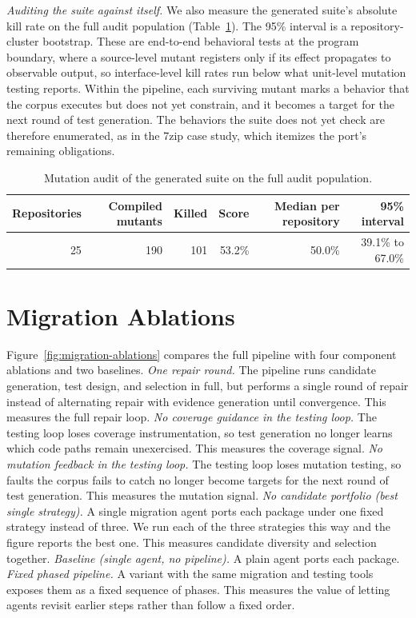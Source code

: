 \emph{Auditing the suite against itself.}
We also measure the generated suite's absolute kill rate on the full audit population (Table~\ref{tab:mutation-audit}).
The 95\% interval is a repository-cluster bootstrap.
These are end-to-end behavioral tests at the program boundary, where a source-level mutant registers only if its effect propagates to observable output, so interface-level kill rates run below what unit-level mutation testing reports.
Within the pipeline, each surviving mutant marks a behavior that the corpus executes but does not yet constrain, and it becomes a target for the next round of test generation.
The behaviors the suite does not yet check are therefore enumerated, as in the 7zip case study, which itemizes the port's remaining obligations.

\begin{table}[h]
\centering
\caption{Mutation audit of the generated suite on the full audit population.}
\label{tab:mutation-audit}
\small
\begin{tabular}{rrrrrr}
\toprule
Repositories & Compiled mutants & Killed & Score & Median per repository & 95\% interval \\
\midrule
25 & 190 & 101 & 53.2\% & 50.0\% & 39.1\% to 67.0\% \\
\bottomrule
\end{tabular}
\end{table}

\section{Migration Ablations}
\label{app:ablation}

Figure~\ref{fig:migration-ablations} compares the full pipeline with four component ablations and two baselines.
\emph{One repair round.} The pipeline runs candidate generation, test design, and selection in full, but performs a single round of repair instead of alternating repair with evidence generation until convergence. This measures the full repair loop.
\emph{No coverage guidance in the testing loop.} The testing loop loses coverage instrumentation, so test generation no longer learns which code paths remain unexercised. This measures the coverage signal.
\emph{No mutation feedback in the testing loop.} The testing loop loses mutation testing, so faults the corpus fails to catch no longer become targets for the next round of test generation. This measures the mutation signal.
\emph{No candidate portfolio (best single strategy).} A single migration agent ports each package under one fixed strategy instead of three. We run each of the three strategies this way and the figure reports the best one. This measures candidate diversity and selection together.
\emph{Baseline (single agent, no pipeline).} A plain agent ports each package.
\emph{Fixed phased pipeline.} A variant with the same migration and testing tools exposes them as a fixed sequence of phases. This measures the value of letting agents revisit earlier steps rather than follow a fixed order.

